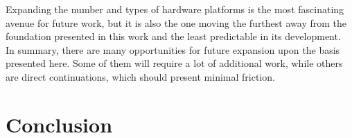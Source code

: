 Expanding the number and types of hardware platforms is the most fascinating avenue for future work, but it is also the one moving the furthest away from the foundation presented in this work and the least predictable in its development. \\
In summary, there are many opportunities for future expansion upon the basis presented here. Some of them will require a lot of additional work, while others are direct continuations, which should present minimal friction.

\section{Conclusion}















